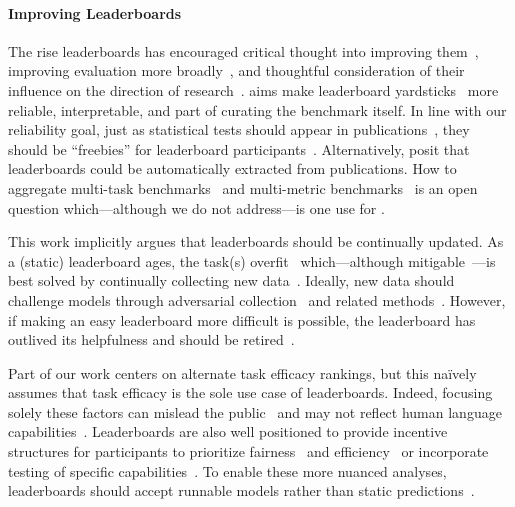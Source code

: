 \paragraph{\textbf{Improving Leaderboards}}
The rise \nlp{} leaderboards has encouraged critical thought into
improving them~\citep{linzen2020progress}, improving evaluation more
broadly~\citep{eger2020workshop}, and thoughtful consideration of
their influence on the direction of
research~\citep{sculley2018curse,dotan2020value}.
\name{} aims make leaderboard
yardsticks~\citep{hernandez2020yardsticks} more reliable,
interpretable, and part of curating the benchmark itself.
In line
with our reliability goal, just as statistical tests should appear in
publications~\citep{dror2018guide,dodge-19}, they should be
``freebies'' for leaderboard
participants~\citep{ethayarajh2020utility}.  Alternatively,
\citet{hou2019leader} posit that leaderboards could be automatically
extracted from publications.
How to aggregate multi-task
benchmarks~\citep{wang2018glue,wang2019superglue,fisch2019mrqa} and multi-metric benchmarks~\citep{ma2021dynaboard} is an
open question which---although we do not address---is one use for
\irt{}.


This work implicitly argues that leaderboards should be
continually updated.  As a (static) leaderboard ages, the task(s)
overfit~\citep{recht2019generalize} which---although
mitigable~\citep{blum2015ladder,andersonCook2019host}---is best solved
by continually collecting new data~\citep{kiela2021dynabench}.
Ideally, new data should challenge models through adversarial
collection~\citep{wallace-19,nie2019adversarial} and related
methods~\citep{Gardner2020-gn}.  However, if making an easy
leaderboard more difficult is possible, the
leaderboard has outlived its helpfulness and should be retired~\citep{voorhees1999trec8}.

Part of our work centers on alternate task efficacy rankings, but this
na\"ively assumes that task efficacy is the sole use case of
leaderboards.
Indeed, focusing solely these factors can mislead the
public~\citep{paullada2020data} and may not reflect human language
capabilities~\citep{schlangen2020targeting}.
Leaderboards are also well positioned to provide incentive structures
for participants to prioritize fairness~\citep{bender2018data} and
efficiency~\citep{strubell2019energy,schwartz2020green,min2021efficientqa}
or incorporate testing of specific
capabilities~\citep{ribeiro2020checklist,Dunietz2020-ty}.
To enable these more nuanced analyses, leaderboards should accept
runnable models rather than static
predictions~\citep{ma2021dynaboard}.

